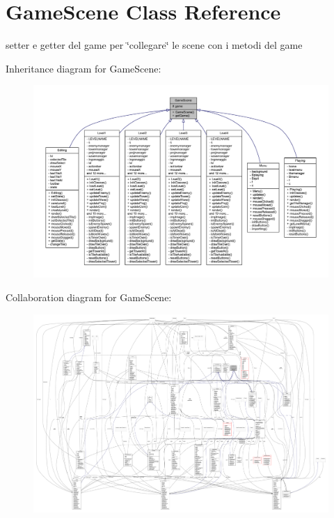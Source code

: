 \hypertarget{classscenes_1_1_game_scene}{}\section{Game\+Scene Class Reference}
\label{classscenes_1_1_game_scene}


setter e getter del game per \char`\"{}collegare\char`\"{} le scene con i metodi del game  




Inheritance diagram for Game\+Scene\+:\nopagebreak
\begin{figure}[H]
\begin{center}
\leavevmode
\includegraphics[width=350pt]{classscenes_1_1_game_scene__inherit__graph}
\end{center}
\end{figure}


Collaboration diagram for Game\+Scene\+:
\nopagebreak
\begin{figure}[H]
\begin{center}
\leavevmode
\includegraphics[width=350pt]{classscenes_1_1_game_scene__coll__graph}
\end{center}
\end{figure}
